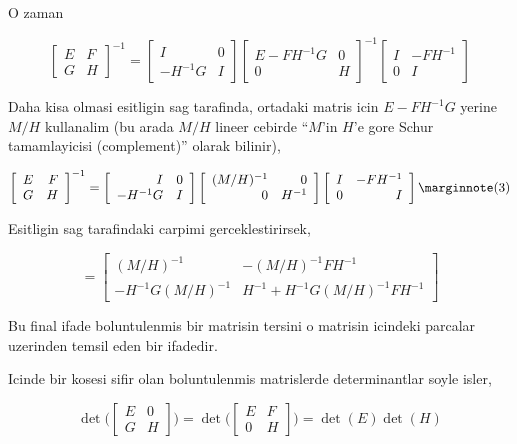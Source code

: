 \documentclass[12pt,fleqn]{article}\usepackage{../common}
\begin{document}
O zaman 

\[ 
\left[\begin{array}{rr}
E & F \\
G & H
\end{array}\right]^{-1}
=
\left[\begin{array}{rr}
I & 0 \\
-H^{-1}G & I
\end{array}\right] 
\left[\begin{array}{rr}
E-FH^{-1}G & 0 \\
0 & H
\end{array}\right]^{-1}
\left[\begin{array}{rr}
I & -FH^{-1} \\
0 & I
\end{array}\right] 
 \]

Daha kisa olmasi esitligin sag tarafinda, ortadaki matris icin
$E-FH^{-1}G$ yerine $M/H$ kullanalim (bu arada $M/H$ lineer cebirde ``$M$'in
$H$'e gore Schur tamamlayicisi (complement)'' olarak bilinir),

\[ 
\left[\begin{array}{rr}
E & F \\
G & H
\end{array}\right]^{-1}
=
\left[\begin{array}{rr}
I & 0 \\
-H^{-1}G & I
\end{array}\right] 
\left[\begin{array}{rr}
(M/H)^{-1} & 0 \\
0 & H^{-1}
\end{array}\right]
\left[\begin{array}{rr}
I & -FH^{-1} \\
0 & I
\end{array}\right] 
\mlabel{3}
 \]

Esitligin sag tarafindaki carpimi gerceklestirirsek, 

\[ =
\left[\begin{array}{rr}
(M/H)^{-1} & -(M/H)^{-1}FH^{-1} \\
-H^{-1}G(M/H)^{-1} & H^{-1}+H^{-1}G(M/H)^{-1}FH^{-1} 
\end{array}\right]
 \]

Bu final ifade boluntulenmis bir matrisin tersini o matrisin icindeki parcalar
uzerinden temsil eden bir ifadedir. 

Icinde bir kosesi sifir olan boluntulenmis matrislerde determinantlar soyle
isler,

\[ 
\det \bigg(
\left[\begin{array}{rr}
E & 0 \\
G & H
\end{array}\right]
\bigg) 
= 
\det \bigg(
\left[\begin{array}{rr}
E & F \\
0 & H
\end{array}\right] 
\bigg) =
\det(E)\det(H)
 \]
\end{document}
